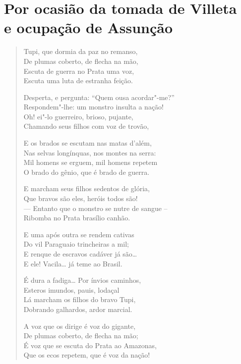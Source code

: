 \chapter[Por ocasião da tomada de Villeta e ocupação de Assunção]{Por ocasião da tomada de Villeta\\ e ocupação de Assunção}

\begin{verse}
Tupi, que dormia da paz no remanso,\\
De plumas coberto, de flecha na mão,\\
Escuta de guerra no Prata uma voz,\\
Escuta uma luta de estranha feição.

Desperta, e pergunta: ``Quem ousa \qb{}acordar"-me?''\\
Respondem"-lhe: um monstro insulta a nação!\\
Oh! ei"-lo guerreiro, brioso, pujante,\\
Chamando seus filhos com voz de trovão,

E os brados se escutam nas matas d'além,\\
Nas selvas longínquas, nos montes na serra:\\
Mil homens se erguem, mil homens repetem\\
O brado do gênio, que é brado de guerra.

E marcham seus filhos sedentos de glória,\\
Que bravos são eles, heróis todos são!\\
--- Entanto que o monstro se nutre de sangue --\\
Ribomba no Prata brasílio canhão.

E uma após outra se rendem cativas\\
Do vil Paraguaio trincheiras a mil;\\
E renque de escravos cadáver já são\ldots{}\\
E ele! Vacila\ldots{} já teme ao Brasil.

É dura a fadiga\ldots{} Por ínvios caminhos,\\
Esteros imundos, pauis, lodaçal\\
Lá marcham os filhos do bravo Tupi,\\
Dobrando galhardos, ardor marcial.

A voz que os dirige é voz do gigante,\\
De plumas coberto, de flecha na mão;\\
É voz que se escuta do Prata ao Amazonas,\\
Que os ecos repetem, que é voz da nação!


\end{verse}
